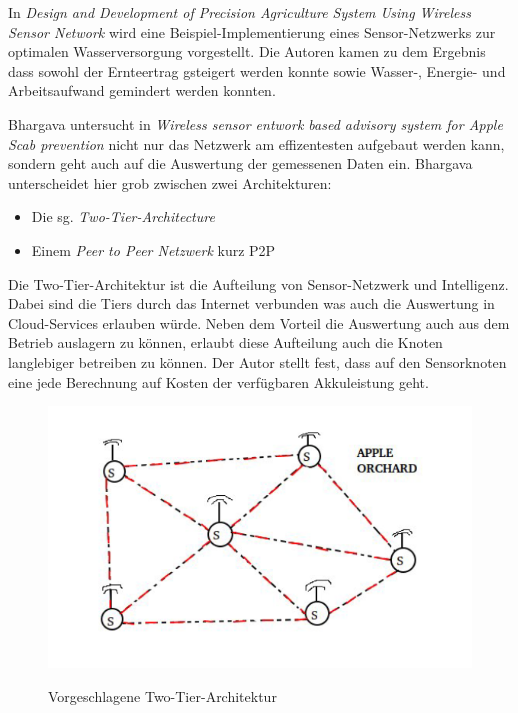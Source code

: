 In \textit{Design and Development of Precision Agriculture System Using Wireless Sensor Network} wird eine Beispiel-Implementierung eines Sensor-Netzwerks zur optimalen Wasserversorgung vorgestellt. Die Autoren kamen zu dem Ergebnis dass sowohl der Ernteertrag gsteigert werden konnte sowie Wasser-, Energie- und Arbeitsaufwand gemindert werden konnten.\cite{jour:Nandurkar2014}

Bhargava untersucht in \textit{Wireless sensor entwork based advisory system for Apple Scab prevention} nicht nur das Netzwerk am effizentesten aufgebaut werden kann, sondern geht auch auf die Auswertung der gemessenen Daten ein. Bhargava unterscheidet hier grob zwischen zwei Architekturen:
\begin{itemize}
	\item Die sg. \textit{Two-Tier-Architecture}
	\item Einem \textit{Peer to Peer Netzwerk} kurz P2P
\end{itemize}

Die Two-Tier-Architektur ist die Aufteilung von Sensor-Netzwerk und Intelligenz. Dabei sind die Tiers durch das Internet verbunden was auch die Auswertung in Cloud-Services erlauben würde. Neben dem Vorteil die Auswertung auch aus dem Betrieb auslagern zu können, erlaubt diese Aufteilung auch die Knoten langlebiger betreiben zu können. Der Autor stellt fest, dass auf den Sensorknoten eine jede Berechnung auf Kosten der verfügbaren Akkuleistung geht.\cite{jour:Bhargava2014}

\begin{figure}[h]
 \includegraphics[scale=0.5,natwidth=\textwidth]{figures/sensors/p2p_architecture.png}
 \centering
 \label{fig:fmishierarchy}
 \caption{Vorgeschlagene Two-Tier-Architektur \cite{jour:Bhargava2014}}
\end{figure}


